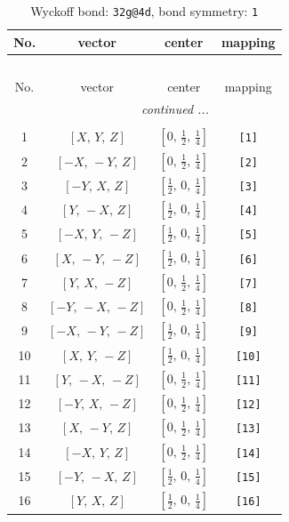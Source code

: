 \documentclass[fleqn,8pt]{jsarticle}
\begin{document}
\begin{longtable}{cccc}
\caption{Wyckoff bond: {\tt 32g@4d}, bond symmetry: {\tt 1}}
 \\
 \hline \hline
No. & vector & center & mapping \\ \hline \endfirsthead

\multicolumn{3}{l}{\tablename\ \thetable{}} \\
 \hline \hline
No. & vector & center & mapping \\ \hline \endhead

 \hline \hline
\multicolumn{3}{r}{\footnotesize\it continued ...} \\ \endfoot

 \hline \hline
\multicolumn{3}{r}{} \\ \endlastfoot

1 & $\left[ X,\, Y,\, Z \right]$ & $\left[ 0,\, \frac{1}{2},\, \frac{1}{4} \right]$ & {\tt [1]} \\ \hline
2 & $\left[ - X,\, - Y,\, Z \right]$ & $\left[ 0,\, \frac{1}{2},\, \frac{1}{4} \right]$ & {\tt [2]} \\ \hline
3 & $\left[ - Y,\, X,\, Z \right]$ & $\left[ \frac{1}{2},\, 0,\, \frac{1}{4} \right]$ & {\tt [3]} \\ \hline
4 & $\left[ Y,\, - X,\, Z \right]$ & $\left[ \frac{1}{2},\, 0,\, \frac{1}{4} \right]$ & {\tt [4]} \\ \hline
5 & $\left[ - X,\, Y,\, - Z \right]$ & $\left[ \frac{1}{2},\, 0,\, \frac{1}{4} \right]$ & {\tt [5]} \\ \hline
6 & $\left[ X,\, - Y,\, - Z \right]$ & $\left[ \frac{1}{2},\, 0,\, \frac{1}{4} \right]$ & {\tt [6]} \\ \hline
7 & $\left[ Y,\, X,\, - Z \right]$ & $\left[ 0,\, \frac{1}{2},\, \frac{1}{4} \right]$ & {\tt [7]} \\ \hline
8 & $\left[ - Y,\, - X,\, - Z \right]$ & $\left[ 0,\, \frac{1}{2},\, \frac{1}{4} \right]$ & {\tt [8]} \\ \hline
9 & $\left[ - X,\, - Y,\, - Z \right]$ & $\left[ \frac{1}{2},\, 0,\, \frac{1}{4} \right]$ & {\tt [9]} \\ \hline
10 & $\left[ X,\, Y,\, - Z \right]$ & $\left[ \frac{1}{2},\, 0,\, \frac{1}{4} \right]$ & {\tt [10]} \\ \hline
11 & $\left[ Y,\, - X,\, - Z \right]$ & $\left[ 0,\, \frac{1}{2},\, \frac{1}{4} \right]$ & {\tt [11]} \\ \hline
12 & $\left[ - Y,\, X,\, - Z \right]$ & $\left[ 0,\, \frac{1}{2},\, \frac{1}{4} \right]$ & {\tt [12]} \\ \hline
13 & $\left[ X,\, - Y,\, Z \right]$ & $\left[ 0,\, \frac{1}{2},\, \frac{1}{4} \right]$ & {\tt [13]} \\ \hline
14 & $\left[ - X,\, Y,\, Z \right]$ & $\left[ 0,\, \frac{1}{2},\, \frac{1}{4} \right]$ & {\tt [14]} \\ \hline
15 & $\left[ - Y,\, - X,\, Z \right]$ & $\left[ \frac{1}{2},\, 0,\, \frac{1}{4} \right]$ & {\tt [15]} \\ \hline
16 & $\left[ Y,\, X,\, Z \right]$ & $\left[ \frac{1}{2},\, 0,\, \frac{1}{4} \right]$ & {\tt [16]} \\
\end{longtable}
\end{document}
